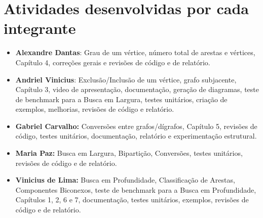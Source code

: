 \chapter{Atividades desenvolvidas por cada integrante}
\label{appn:A}

\begin{itemize}
  \item \textbf{Alexandre Dantas}: Grau de um vértice, número total de
    arestas e vértices, Capítulo 4, correções gerais e revisões de
    código e de relatório.
  \item \textbf{Andriel Vinicius}: Exclusão/Inclusão de um vértice,
    grafo subjacente, Capítulo 3, video de apresentação,
    documentação, geração de diagramas, teste de benchmark para a
    Busca em Largura, testes unitários, criação de exemplos, melhorias,
    revisões de código e relatório.
  \item \textbf{Gabriel Carvalho:} Conversões entre grafos/dígrafos,
    Capítulo 5, revisões de código, testes unitários, documentação, relatório e
    experimentação estrutural.
  \item \textbf{Maria Paz:} Busca em Largura, Bipartição, Conversões,
    testes unitários, revisões de código e de relatório.
  \item \textbf{Vinicius de Lima:} Busca em Profundidade,
    Classificação de Arestas, Componentes Biconexos, teste de
    benchmark para a Busca em Profundidade, Capítulos 1, 2, 6 e 7,
    documentação, testes unitários, exemplos, revisões de código e de relatório.
\end{itemize}
